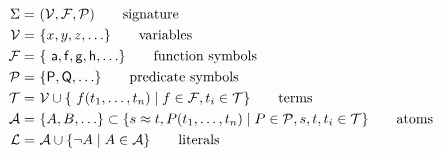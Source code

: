 \begin{align*}
 \Sigma = &\ (\SIGV, \SIGF, \SIGP) 						
 \tag*{signature}
 \\
 \SIGV = &\ \{x,y,z,\ldots\}									
 \tag*{variables}
 \\
 \SIGF = &\ \{ \ma,\mf,\mg,\mh,\ldots \}			
 \tag*{function symbols}
 \\
 \SIGP = &\ \{ \mP, \mQ, \ldots\}																			
 \tag*{predicate symbols} 
 \\
 \SIGT = &\ \SIGV \cup \{ f(t_1,\ldots,t_n)\mid f\in\SIGF, t_i \in \SIGT \}			
 \tag*{terms}
 \\
\SIGA = &\ \{ A, B, \ldots\} \subset \{ s\foEQ t, P ( t_1, \ldots, t_n )\mid P\in\SIGP, s,t,t_i \in \SIGT\}
\tag*{atoms}
\\
\SIGL = &\ \SIGA \cup \{ \lnot A \mid A\in \SIGA \}
\tag*{literals}
\\
\end{align*}
\ENDX



